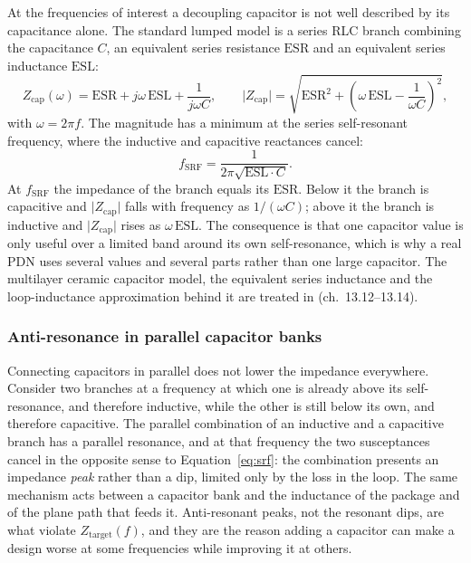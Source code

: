 At the frequencies of interest a decoupling capacitor is not well described by
its capacitance alone. The standard lumped model is a series RLC branch
combining the capacitance $C$, an equivalent series resistance $\mathrm{ESR}$
and an equivalent series inductance $\mathrm{ESL}$:
\begin{equation}
Z_{\mathrm{cap}}(\omega) = \mathrm{ESR} + j\omega\,\mathrm{ESL}
+ \frac{1}{j\omega C},
\qquad
\lvert Z_{\mathrm{cap}} \rvert
= \sqrt{\mathrm{ESR}^2 + \left(\omega\,\mathrm{ESL} - \frac{1}{\omega C}\right)^{2}},
\label{eq:cap_rlc}
\end{equation}
with $\omega = 2\pi f$. The magnitude has a minimum at the series self-resonant
frequency, where the inductive and capacitive reactances cancel:
\begin{equation}
f_{\mathrm{SRF}} = \frac{1}{2\pi\sqrt{\mathrm{ESL}\cdot C}} .
\label{eq:srf}
\end{equation}
At $f_{\mathrm{SRF}}$ the impedance of the branch equals its $\mathrm{ESR}$.
Below it the branch is capacitive and $\lvert Z_{\mathrm{cap}} \rvert$ falls with
frequency as $1/(\omega C)$; above it the branch is inductive and
$\lvert Z_{\mathrm{cap}} \rvert$ rises as $\omega\,\mathrm{ESL}$. The
consequence is that one capacitor value is only useful over a limited band around
its own self-resonance, which is why a real PDN uses several values and several
parts rather than one large capacitor. The multilayer ceramic capacitor model,
the equivalent series inductance and the loop-inductance approximation behind it
are treated in \cite{bogatin2018signal} (ch.~13.12--13.14).

\subsubsection*{Anti-resonance in parallel capacitor banks}

Connecting capacitors in parallel does not lower the impedance everywhere.
Consider two branches at a frequency at which one is already above its
self-resonance, and therefore inductive, while the other is still below its own,
and therefore capacitive. The parallel combination of an inductive and a
capacitive branch has a parallel resonance, and at that frequency the two
susceptances cancel in the opposite sense to Equation~\ref{eq:srf}: the
combination presents an impedance \emph{peak} rather than a dip, limited only by
the loss in the loop. The same mechanism acts between a capacitor bank and the
inductance of the package and of the plane path that feeds it. Anti-resonant
peaks, not the resonant dips, are what violate $Z_{\mathrm{target}}(f)$, and they
are the reason adding a capacitor can make a design worse at some frequencies
while improving it at others.

